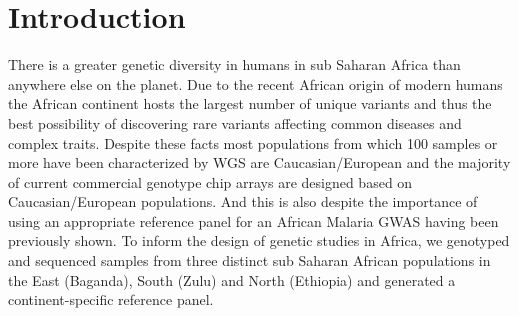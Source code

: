 \section{Introduction}
There is a greater genetic diversity in humans in sub Saharan Africa than anywhere else on the planet.\cite{Bowcock1994}\cite{Jorde1995}\cite{Tishkoff08031996}\cite{Jorde2000}\cite{Stephens2001}\cite{Tishkoff2002}\cite{Tishkoff2004}\cite{HapMap2005}\cite{Ramachandran01112005}\cite{Tishkoff22052009}\cite{1000G2010}\cite{1000G2012} Due to the recent African origin of modern humans the African continent hosts the largest number of unique variants and thus the best possibility of discovering rare variants affecting common diseases and complex traits. Despite these facts most populations from which 100 samples or more have been characterized by \gls{WGS} are Caucasian/European and the majority of current commercial genotype chip arrays are designed based on Caucasian/European populations. And this is also despite the importance of using an appropriate reference panel for an African Malaria GWAS having been previously shown.\cite{2009Jallow} To inform the design of genetic studies in Africa, we genotyped and sequenced samples from three distinct sub Saharan African populations in the East (Baganda), South (Zulu) and North (Ethiopia) and generated a continent-specific reference panel.